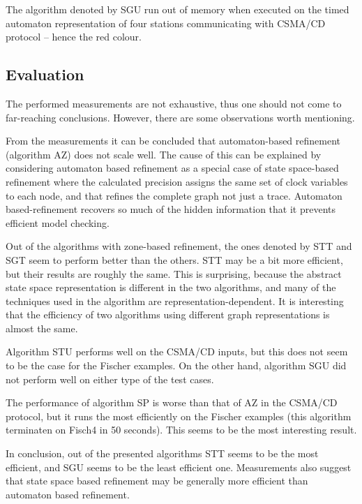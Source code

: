 The algorithm denoted by SGU run out of memory when executed on the timed automaton representation of four stations communicating with CSMA/CD protocol -- hence the red colour.

\subsection{Evaluation}

The performed measurements are not exhaustive, thus one should not come to far-reaching conclusions. However, there are some observations worth mentioning.

From the measurements it can be concluded that automaton-based refinement (algorithm AZ) does not scale well. The cause of this can be explained by considering automaton based refinement as a special case of state space-based refinement where the calculated precision assigns the same set of clock variables to each node, and that refines the complete graph not just a trace. Automaton based-refinement recovers so much of the hidden information that it prevents efficient model checking.

Out of the algorithms with zone-based refinement, the ones denoted by STT and SGT seem to perform better than the others. STT may be a bit more efficient, but their results are roughly the same. This is surprising, because the abstract state space representation is different in the two algorithms, and many of the techniques used in the algorithm are representation-dependent. It is interesting that the efficiency of two algorithms using different graph representations is almost the same.

Algorithm STU performs well on the CSMA/CD inputs, but this does not seem to be the case for the Fischer examples. On the other hand, algorithm SGU did not perform well on either type of the test cases.

The performance of algorithm SP is worse than that of AZ in the CSMA/CD protocol, but it runs the most efficiently on the Fischer examples (this algorithm terminaten on Fisch4 in 50 seconds). This seems to be the most interesting result.

In conclusion, out of the presented algorithms STT seems to be the most efficient, and SGU seems to be the least efficient one. Measurements also suggest that state space based refinement may be generally more efficient than automaton based refinement.




